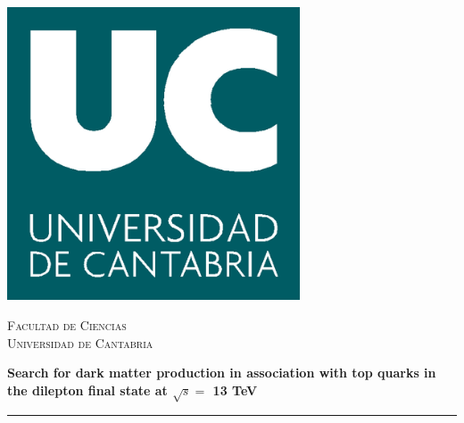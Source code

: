 \documentclass[a4paper, 10pt, openright]{report}
\begin{document}
\renewcommand{\listfigurename}{List of figures} 
\renewcommand{\listtablename}{List of tables}
\renewcommand{\floatpagefraction}{.95}%


\setlength{\parfillskip}{0pt plus\dimexpr\textwidth-2\parindent}

\doublespacing
{}\baselineskip
\setlength{\parindent}{0pt}	

\renewcommand{\arraystretch}{1.5}

\begin{titlepage}

	\centering
	\vspace*{-1.4cm}
	\begin{minipage}[t]{.29\textwidth}
	\includegraphics[width=0.65\textwidth]{figs/image_UC.png}
	\end{minipage}
	\begin{minipage}[t]{.69\textwidth}
	\begin{flushright}
	\vspace*{-2.6cm}
	{\scshape\LARGE Facultad de Ciencias \\ \vspace{-15pt} Universidad de Cantabria \par}
	\end{flushright}
	\end{minipage}	
	
	\vspace{2.5cm}
	
	{\huge\bfseries Search for dark matter production in association with top quarks in the dilepton final state at $\sqrt{s} = $ 13 TeV\par \vspace{65pt}}
	\noindent\rule{15cm}{0.4pt}\par 
	

\end{titlepage}
\end{document}
